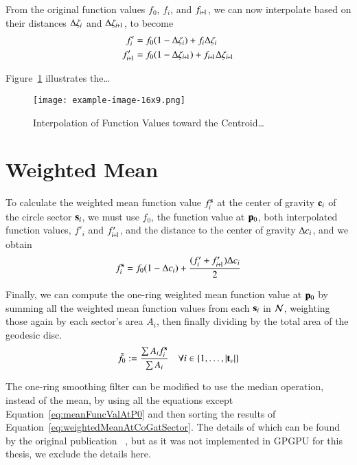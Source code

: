 From the original function values $f_0$, $f_i$, and $f_{\sipo}$, we can now interpolate based on their distances $\Delta\zeta_i$ and $\Dz_{\sipo}$, to become
\begin{align}
	f'_i & = f_0(1 - \Dz_i) + f_i\Dz_i
	\label{eq:interpolatedFi} \\
	f'_{\sipo} & = f_0(1 - \Dz_{\sipo}) + f_{\sipo}\Dz_{\sipo}
	\label{eq:interpolatedFip1}
\end{align}%
%

Figure~\ref{fig:interpolation} illustrates the\dots
\begin{figure}[ht]
\ffigbox
	{\texttt{[image: example-image-16x9.png]}}
	{\caption[Interpolation of Function Values toward the Centroid]{Interpolation of Function Values toward the Centroid\ldots}\label{fig:interpolation}}
\end{figure}
%
\section{Weighted Mean}
\label{cFONSsWM}
To calculate the weighted mean function value $f^{\mathbf{s}}_i$ at the center of gravity $\mathbf{c}_i$ of the circle sector $\mathbf{s}_i$, we must use $f_0$, the function value at $\mathbf{p}_0$, both interpolated function values, $f'_i$ and $f'_{\sipo}$, and the distance to the center of gravity $\Delta c_i$, and we obtain
\begin{equation}
	f^\bs_i = f_0(1 - \Dc_i) + \frac{(f'_i + f'_{\sipo})\Dc_i}{2}
	\label{eq:weightedMeanAtCoGatSector}
\end{equation}%
%

Finally, we can compute the one-ring weighted mean function value at $\mathbf{p}_0$ by summing all the weighted mean function values from each $\mathbf{s}_i$ in $\mathcal{N}$, weighting those again by each sector's area $A_i$, then finally dividing by the total area of the geodesic disc.
\begin{equation}
	\bar{f}_0 := \frac{\sum A_if^{\mathbf{s}}_i}{\sum A_i} \quad \forall i \in \{1,\ldots,|\mathbf{t}_v|\}
	\label{eq:meanFuncValAtP0}
\end{equation}%
%
%

The one-ring smoothing filter can be modified to use the median operation, instead of the mean, by using all the equations except Equation~\ref{eq:meanFuncValAtP0} and then sorting the results of Equation~\ref{eq:weightedMeanAtCoGatSector}. The details of which can be found by the original publication ~\cite[s.~3.2]{Mara17}, but as it was not implemented in GPGPU for this thesis, we exclude the details here.

